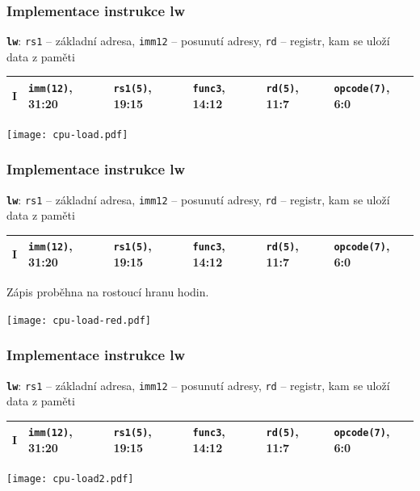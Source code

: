 \documentclass{beamer}
\begin{document}
\begin{frame}[shrink=15]
\frametitle{Implementace instrukce lw}

\textbf{\texttt{lw}}: \texttt{rs1} -- základní adresa, \texttt{imm12} -- posunutí adresy, \texttt{rd} -- registr, kam se uloží data z paměti

\bigskip

\begin{tabular}{|l|l|l|l|l|l|}\hline
I & \textbf{\texttt{imm(12)}}, 31:20 & \textbf{\texttt{rs1(5)}}, 19:15 & \textbf{\texttt{func3}}, 14:12 & \textbf{\texttt{rd(5)}}, 11:7 & \textbf{\texttt{opcode(7)}}, 6:0 \\ \hline
\end{tabular}

\bigskip

\begin{center}
\texttt{[image: cpu-load.pdf]}
\end{center}

\end{frame}

\begin{frame}[shrink=15]
\frametitle{Implementace instrukce lw}

\textbf{\texttt{lw}}: \texttt{rs1} -- základní adresa, \texttt{imm12} -- posunutí adresy, \texttt{rd} -- registr, kam se uloží data z paměti

\bigskip

\begin{tabular}{|l|l|l|l|l|l|}\hline
I & \textbf{\texttt{imm(12)}}, 31:20 & \textbf{\texttt{rs1(5)}}, 19:15 & \textbf{\texttt{func3}}, 14:12 & \textbf{\texttt{rd(5)}}, 11:7 & \textbf{\texttt{opcode(7)}}, 6:0 \\ \hline
\end{tabular}

Zápis proběhna na rostoucí hranu hodin.

\begin{center}
\texttt{[image: cpu-load-red.pdf]}
\end{center}



\end{frame}


\begin{frame}[shrink=15]
\frametitle{Implementace instrukce lw}

\textbf{\texttt{lw}}: \texttt{rs1} -- základní adresa, \texttt{imm12} -- posunutí adresy, \texttt{rd} -- registr, kam se uloží data z paměti

\bigskip

\begin{tabular}{|l|l|l|l|l|l|}\hline
I & \textbf{\texttt{imm(12)}}, 31:20 & \textbf{\texttt{rs1(5)}}, 19:15 & \textbf{\texttt{func3}}, 14:12 & \textbf{\texttt{rd(5)}}, 11:7 & \textbf{\texttt{opcode(7)}}, 6:0 \\ \hline
\end{tabular}

\bigskip

\begin{center}
\texttt{[image: cpu-load2.pdf]}
\end{center}
\end{frame}
\end{document}
